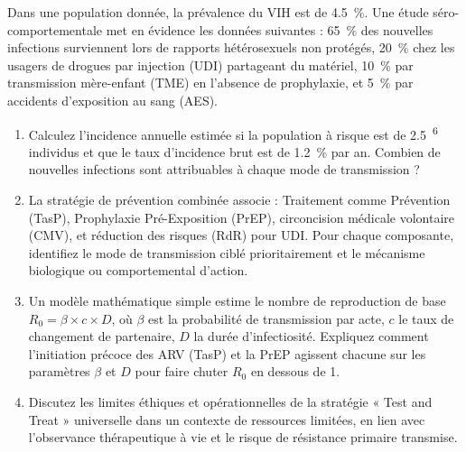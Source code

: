 \documentclass[11pt]{article}
\begin{document}
\begin{exercice}
Dans une population donnée, la prévalence du VIH est de \SI{4,5}{\%}. Une étude séro-comportementale met en évidence les données suivantes : \SI{65}{\%} des nouvelles infections surviennent lors de rapports hétérosexuels non protégés, \SI{20}{\%} chez les usagers de drogues par injection (UDI) partageant du matériel, \SI{10}{\%} par transmission mère-enfant (TME) en l'absence de prophylaxie, et \SI{5}{\%} par accidents d'exposition au sang (AES).

\begin{enumerate}
    \item Calculez l'incidence annuelle estimée si la population à risque est de \SI{2,5}{^6} individus et que le taux d'incidence brut est de \SI{1,2}{\%} par an. Combien de nouvelles infections sont attribuables à chaque mode de transmission ?
    \item La stratégie de prévention combinée associe : Traitement comme Prévention (TasP), Prophylaxie Pré-Exposition (PrEP), circoncision médicale volontaire (CMV), et réduction des risques (RdR) pour UDI. Pour chaque composante, identifiez le mode de transmission ciblé prioritairement et le mécanisme biologique ou comportemental d'action.
    \item Un modèle mathématique simple estime le nombre de reproduction de base $R_0 = \beta \times c \times D$, où $\beta$ est la probabilité de transmission par acte, $c$ le taux de changement de partenaire, $D$ la durée d'infectiosité. Expliquez comment l'initiation précoce des ARV (TasP) et la PrEP agissent chacune sur les paramètres $\beta$ et $D$ pour faire chuter $R_0$ en dessous de 1.
    \item Discutez les limites éthiques et opérationnelles de la stratégie « Test and Treat » universelle dans un contexte de ressources limitées, en lien avec l'observance thérapeutique à vie et le risque de résistance primaire transmise.
\end{enumerate}
\end{exercice}
\end{document}
